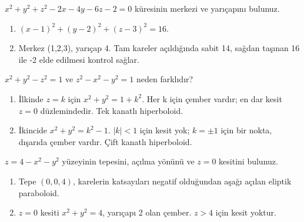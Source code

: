 \begin{tcolorbox}[title={Örnek 2.15 | Defterdeki ikinci küre},colframe=accent]\(x^2+y^2+z^2-2x-4y-6z-2=0\) küresinin merkezi ve yarıçapını bulunuz.
\par{}\end{tcolorbox}
\begin{tcolorbox}[title={Adım adım çözüm},colback=green!3!white,colframe=green]\begin{enumerate}
\item \((x-1)^2+(y-2)^2+(z-3)^2=16\).
\item Merkez (1,2,3), yarıçap 4. Tam kareler açıldığında sabit 14, sağdan taşınan 16 ile -2 elde edilmesi kontrol sağlar.
\end{enumerate}\end{tcolorbox}
\begin{tcolorbox}[title={Örnek 2.16 | İki yüzeyin kesitlerini karşılaştır},colframe=accent]\(x^2+y^2-z^2=1\) ve \(z^2-x^2-y^2=1\) neden farklıdır?
\par\vspace{1mm}{\scriptsize\sffamily Pekiştirme}\end{tcolorbox}
\begin{tcolorbox}[title={Adım adım çözüm},colback=green!3!white,colframe=green]\begin{enumerate}
\item İlkinde \(z=k\) için \(x^2+y^2=1+k^2\). Her k için çember vardır; en dar kesit \(z=0\) düzlemindedir. Tek kanatlı hiperboloid.
\item İkincide \(x^2+y^2=k^2-1\). \(|k|<1\) için kesit yok; \(k=\pm1\) için bir nokta, dışarıda çember vardır. Çift kanatlı hiperboloid.
\end{enumerate}\end{tcolorbox}
\begin{tcolorbox}[title={Örnek 2.17 | Pekiştirme: yüzeyi tanı},colframe=accent]\(z=4-x^2-y^2\) yüzeyinin tepesini, açılma yönünü ve \(z=0\) kesitini bulunuz.
\par\vspace{1mm}{\scriptsize\sffamily Pekiştirme}\end{tcolorbox}
\begin{tcolorbox}[title={Adım adım çözüm},colback=green!3!white,colframe=green]\begin{enumerate}
\item Tepe \((0,0,4)\), karelerin katsayıları negatif olduğundan aşağı açılan eliptik paraboloid.
\item \(z=0\) kesiti \(x^2+y^2=4\), yarıçapı 2 olan çember. \(z>4\) için kesit yoktur.
\end{enumerate}\end{tcolorbox}
